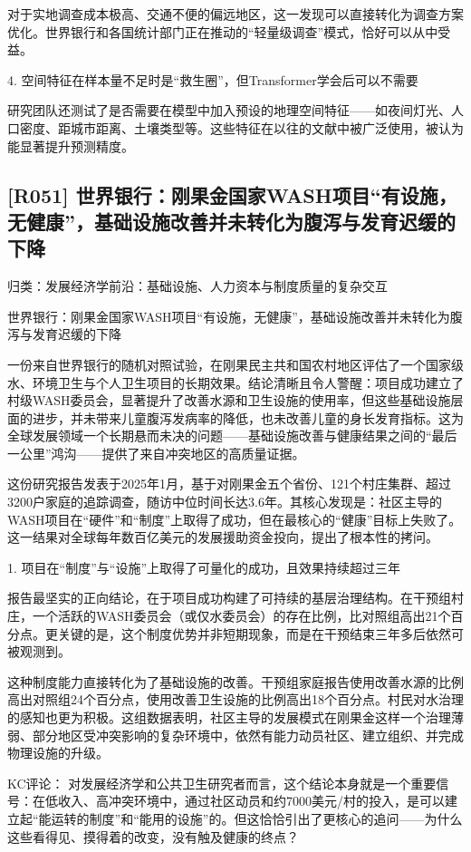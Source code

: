 \documentclass[11pt]{ctexart}
\begin{document}
对于实地调查成本极高、交通不便的偏远地区，这一发现可以直接转化为调查方案优化。世界银行和各国统计部门正在推动的“轻量级调查”模式，恰好可以从中受益。

4. 空间特征在样本量不足时是“救生圈”，但Transformer学会后可以不需要

研究团队还测试了是否需要在模型中加入预设的地理空间特征——如夜间灯光、人口密度、距城市距离、土壤类型等。这些特征在以往的文献中被广泛使用，被认为能显著提升预测精度。

\subsection{[R051] 世界银行：刚果金国家WASH项目“有设施，无健康”，基础设施改善并未转化为腹泻与发育迟缓的下降}
{\small\color{refgray}归类：发展经济学前沿：基础设施、人力资本与制度质量的复杂交互}

世界银行：刚果金国家WASH项目“有设施，无健康”，基础设施改善并未转化为腹泻与发育迟缓的下降

一份来自世界银行的随机对照试验，在刚果民主共和国农村地区评估了一个国家级水、环境卫生与个人卫生项目的长期效果。结论清晰且令人警醒：项目成功建立了村级WASH委员会，显著提升了改善水源和卫生设施的使用率，但这些基础设施层面的进步，并未带来儿童腹泻发病率的降低，也未改善儿童的身长发育指标。这为全球发展领域一个长期悬而未决的问题——基础设施改善与健康结果之间的“最后一公里”鸿沟——提供了来自冲突地区的高质量证据。

这份研究报告发表于2025年1月，基于对刚果金五个省份、121个村庄集群、超过3200户家庭的追踪调查，随访中位时间长达3.6年。其核心发现是：社区主导的WASH项目在“硬件”和“制度”上取得了成功，但在最核心的“健康”目标上失败了。这一结果对全球每年数百亿美元的发展援助资金投向，提出了根本性的拷问。

1. 项目在“制度”与“设施”上取得了可量化的成功，且效果持续超过三年

报告最坚实的正向结论，在于项目成功构建了可持续的基层治理结构。在干预组村庄，一个活跃的WASH委员会（或仅水委员会）的存在比例，比对照组高出21个百分点。更关键的是，这个制度优势并非短期现象，而是在干预结束三年多后依然可被观测到。

这种制度能力直接转化为了基础设施的改善。干预组家庭报告使用改善水源的比例高出对照组24个百分点，使用改善卫生设施的比例高出18个百分点。村民对水治理的感知也更为积极。这组数据表明，社区主导的发展模式在刚果金这样一个治理薄弱、部分地区受冲突影响的复杂环境中，依然有能力动员社区、建立组织、并完成物理设施的升级。

KC评论： 对发展经济学和公共卫生研究者而言，这个结论本身就是一个重要信号：在低收入、高冲突环境中，通过社区动员和约7000美元/村的投入，是可以建立起“能运转的制度”和“能用的设施”的。但这恰恰引出了更核心的追问——为什么这些看得见、摸得着的改变，没有触及健康的终点？
\end{document}
